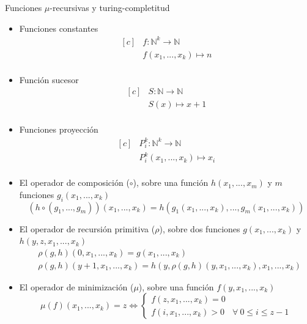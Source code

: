 \documentclass[compress]{beamer}
\begin{document}
\begin{frame}{Funciones $\mu$-recursivas y turing-completitud}
	\begin{itemize}
		\item Funciones constantes
		\begin{equation*}
		\begin{aligned}[c]
		&f \colon \mathbb{N}^k \to \mathbb{N}\\
		&f(x_1,...,x_k) \mapsto n \\
		\end{aligned}
		\end{equation*}
		
		\item Función sucesor
		\begin{equation*}
		\begin{aligned}[c]
		&S \colon \mathbb{N} \to \mathbb{N}\\
		&S(x) \mapsto x + 1 \\
		\end{aligned}
		\end{equation*}
		
		\item Funciones proyección
		\begin{equation*}
		\begin{aligned}[c]
		&P_i^k \colon \mathbb{N}^k \to \mathbb{N}\\
		&P_i^k(x_1, ..., x_k) \mapsto x_i \\
		\end{aligned}
		\end{equation*}
		
	\end{itemize}
\end{frame}
\begin{frame}	
	\begin{itemize}
		\item El operador de composición ($\circ$), sobre una función $h(x_1, ..., x_m)$ y $m$ funciones $g_i(x_1, ..., x_k)$
		$$(h \circ (g_1, ..., g_m))(x_1, ..., x_k) = h(g_1(x_1, ..., x_k), ..., g_m(x_1, ..., x_k))$$
		
		\bigskip
		\item El operador de recursión primitiva ($\rho$), sobre dos funciones $g(x_1, ..., x_k)$ y $h(y,z,x_1, ..., x_k)$
		\begin{align*}
		&\rho(g, h)(0, x_1, ..., x_k) = g(x_1, ..., x_k)\\
		&\rho(g, h)(y+1, x_1, ..., x_k) = h(y, \rho(g, h)(y, x_1, ..., x_k), x_1, ..., x_k)
		\end{align*}
		
		\bigskip
		\item El operador de minimización ($\mu$), sobre una función $f(y, x_1, ..., x_k)$
		\[
		\mu(f)(x_1, ..., x_k) = z \Leftrightarrow
		\begin{cases}
		f(z, x_1, ..., x_k) = 0\\
		f(i, x_1, ..., x_k) > 0 &\forall\ 0 \leq i \leq z-1
		\end{cases}
		\]
		
	\end{itemize}
\end{frame}
\end{document}
